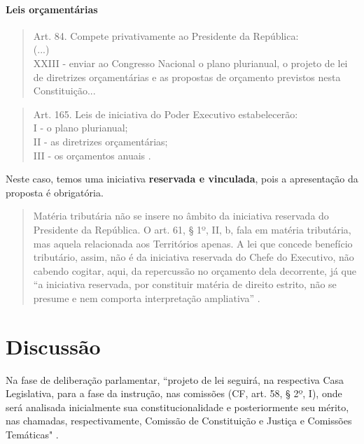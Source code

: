 \documentclass{article}
\begin{document}
\paragraph{Leis orçamentárias}

\begin{quote}
    Art. 84. Compete privativamente ao Presidente da República:\\
    (...)\\
    XXIII - enviar ao Congresso Nacional o plano plurianual, o projeto de lei de diretrizes orçamentárias e as propostas de orçamento previstos nesta Constituição... \cite{brasil_constituicao_1988}
\end{quote}

\begin{quote}
    Art. 165. Leis de iniciativa do Poder Executivo estabelecerão:\\
    I - o plano plurianual;\\
    II - as diretrizes orçamentárias;\\
    III - os orçamentos anuais \cite{brasil_constituicao_1988}.
\end{quote}

Neste caso, temos uma iniciativa \textbf{reservada e vinculada}, pois a apresentação da proposta é obrigatória.

\begin{quote}
    Matéria tributária não se insere no âmbito da iniciativa reservada do Presidente da República. O art. 61, § 1º, II, b, fala em matéria tributária, mas aquela relacionada aos Territórios apenas. A lei que concede benefício tributário, assim, não é da iniciativa reservada do Chefe do Executivo, não cabendo cogitar, aqui, da repercussão no orçamento dela decorrente, já que ``a iniciativa reservada, por constituir matéria de direito estrito, não se presume e nem comporta interpretação ampliativa” \cite[p.~1058]{mendes_curso_2024}.
\end{quote}

\section{Discussão}

Na fase de deliberação parlamentar, ``projeto de lei seguirá, na respectiva Casa Legislativa, para a fase da instrução, nas comissões (CF, art. 58, § 2º, I), onde será analisada inicialmente sua constitucionalidade e posteriormente seu mérito, nas chamadas, respectivamente, Comissão de Constituição e Justiça e Comissões Temáticas" \cite[p.~766]{moraes_direito_2023}.
\end{document}
